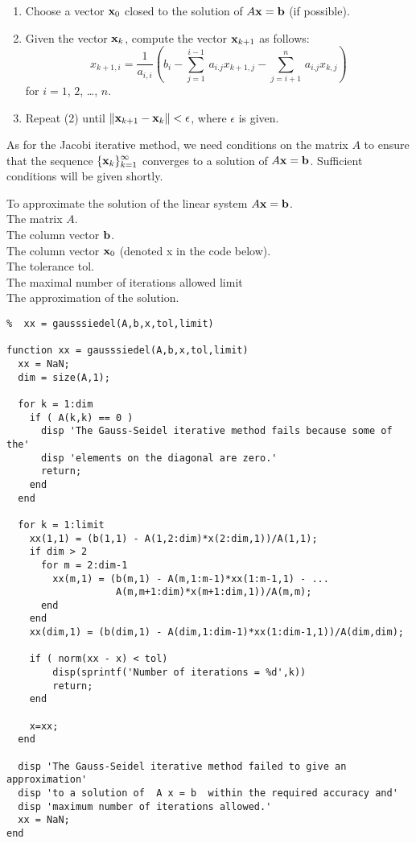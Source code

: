 \begin{algo}
\begin{enumerate}
\item Choose a vector $\mathbf{x}_{0}$ closed to the solution of
$ A \mathbf{x} = \mathbf{b}$ (if possible).
\item Given the vector $\mathbf{x}_{k}$, compute the vector
$\mathbf{x}_{k+1}$ as follows:
\begin{equation} \label{formula6}
x_{k+1,i} = \frac{1}{a_{i,i}} \left(b_i -\sum_{j=1}^{i-1}\, a_{i.j}
x_{k+1,j} -\sum_{j=i+1}^{n}\, a_{i.j} x_{k,j} \right)
\end{equation}
for $i = 1$, $2$, \ldots, $n$.
\item Repeat (2) until $\| \mathbf{x}_{k+1} - \mathbf{x}_{k} \| < \epsilon$,
where $\epsilon$ is given.
\end{enumerate}
\end{algo}

As for the Jacobi iterative method, we need conditions on the matrix
$A$ to ensure that the sequence $\displaystyle \{\mathbf{x}_k\}_{k=1}^\infty$
converges to a solution of $A\mathbf{x} = \mathbf{b}$.  Sufficient
conditions will be given shortly.

\begin{code}
To approximate the solution of the linear system $A \mathbf{x} = \mathbf{b}$.\\
 The matrix $A$.\\
The column vector $\mathbf{b}$.\\
The column vector $\mathbf{x}_0$ (denoted x in the code below).\\
The tolerance  tol.\\
The maximal number of iterations allowed  limit\\
 The approximation of the solution.
\small
\begin{verbatim}
%  xx = gausssiedel(A,b,x,tol,limit)

function xx = gausssiedel(A,b,x,tol,limit)
  xx = NaN;
  dim = size(A,1);

  for k = 1:dim
    if ( A(k,k) == 0 )
      disp 'The Gauss-Seidel iterative method fails because some of the'
      disp 'elements on the diagonal are zero.'
      return;
    end
  end

  for k = 1:limit
    xx(1,1) = (b(1,1) - A(1,2:dim)*x(2:dim,1))/A(1,1);
    if dim > 2
      for m = 2:dim-1
        xx(m,1) = (b(m,1) - A(m,1:m-1)*xx(1:m-1,1) - ...
                   A(m,m+1:dim)*x(m+1:dim,1))/A(m,m);
      end
    end
    xx(dim,1) = (b(dim,1) - A(dim,1:dim-1)*xx(1:dim-1,1))/A(dim,dim);

    if ( norm(xx - x) < tol)
        disp(sprintf('Number of iterations = %d',k))
        return;
    end

    x=xx;
  end

  disp 'The Gauss-Seidel iterative method failed to give an approximation'
  disp 'to a solution of  A x = b  within the required accuracy and'
  disp 'maximum number of iterations allowed.'
  xx = NaN;
end
\end{verbatim}
\end{code}

